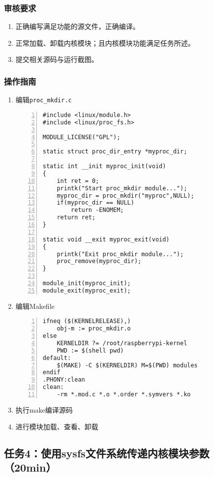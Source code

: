 \documentclass{article}
\begin{document}
\subsubsection{审核要求}
\begin{enumerate}
	\item 正确编写满足功能的源文件，正确编译。
	\item 正常加载、卸载内核模块；且内核模块功能满足任务所述。
	\item 提交相关源码与运行截图。
\end{enumerate}

\subsubsection{操作指南}
\begin{enumerate}
	\item 编辑\verb|proc_mkdir.c|
	      \begin{lstlisting}[numbers=left]
#include <linux/module.h>
#include <linux/proc_fs.h>

MODULE_LICENSE("GPL");

static struct proc_dir_entry *myproc_dir; 

static int __init myproc_init(void)
{
	int ret = 0;
	printk("Start proc_mkdir module...");
	myproc_dir = proc_mkdir("myproc",NULL);
	if(myproc_dir == NULL)
		return -ENOMEM;
	return ret;
}

static void __exit myproc_exit(void)
{
	printk("Exit proc_mkdir module...");
	proc_remove(myproc_dir);
}

module_init(myproc_init); 
module_exit(myproc_exit);

\end{lstlisting}
	\item 编辑Makefile
	      \begin{lstlisting}[numbers=left]
ifneq ($(KERNELRELEASE),)
	obj-m := proc_mkdir.o
else
	KERNELDIR ?= /root/raspberrypi-kernel
	PWD := $(shell pwd)
default:
	$(MAKE) -C $(KERNELDIR) M=$(PWD) modules
endif
.PHONY:clean
clean:
	-rm *.mod.c *.o *.order *.symvers *.ko

\end{lstlisting}
	\item 执行make编译源码
	\item 进行模块加载、查看、卸载
\end{enumerate}

\newpage
\subsection{任务4：使用sysfs文件系统传递内核模块参数（20min）}
\end{document}
